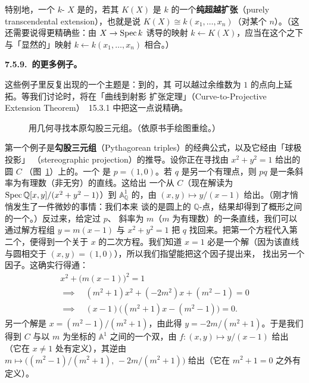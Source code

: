 特别地，一个\trIntegral\trAffine{} $k$-\trVariety{} $X$ 是\trRational{}的，若其\trFunctionField{}%
$K(X)$ 是 $k$ 的一个\textbf{纯超越扩张}（purely transcendental extension），也就是说%
$K(X)\cong k(x_1,\dots,x_n)$（对某个 $n$）。（这还需要说得更精确些：由 $X\to\operatorname{Spec} k$ %
诱导的映射 $k\leftarrow K(X)$，应当在这个\trIsomorphism{}之下与「显然的」映射%
$k\leftarrow k(x_1,\dots,x_n)$ 相合。）

\textbf{7.5.9.\ \trRationalMap{}的更多例子。}

这些例子里反复出现的一个主题是：到\trProjectiveScheme{}的\trRationalMap{}，其\trDomainOfDefinition{}%
可以越过余维数为 $1$ 的\trRegular{}点向上延拓。等我们讨论\trCurve{}时，将在「曲线到射影%
扩张定理」（Curve-to-Projective Extension Theorem）~15.3.1 中把这一点说精确。

\begin{figure}[htbp]
\centering
{}
\caption{用几何寻找本原勾股三元组。（依原书手绘图重绘。）}
\label{fig:pythagorean-stereographic}
\end{figure}

第一个例子是\textbf{勾股三元组}（Pythagorean triples）的经典公式，以及它经由「球极投影」%
（stereographic projection）的推导。设你正在寻找由 $x^2+y^2=1$ 给出的圆 $C$ %
（图~\ref{fig:pythagorean-stereographic}）上的\trRationalPoint。一个\trRationalPoint{}%
是 $p=(1,0)$。若 $q$ 是另一个有理点，则 $pq$ 是一条斜率为有理数（非无穷）的直线。这给出%
一个从\trConic{} $C$（现在解读为 $\operatorname{Spec}\mathbb{Q}[x,y]/(x^2+y^2-1)$）到 $\mathbb{A}^1_{\mathbb{Q}}$ %
的\trRationalMap{}，由 $(x,y)\mapsto y/(x-1)$ 给出。（刚才悄悄发生了一件微妙的事情：我们本来%
谈的是圆上的 $\mathbb{Q}$-点，结果却得到了概形之间的一个\trRationalMap{}。）反过来，给定过 $p$、%
斜率为 $m$（$m$ 为有理数）的一条直线，我们可以通过解方程组 $y=m(x-1)$ 与 $x^2+y^2=1$ %
把 $q$ 找回来。把第一个方程代入第二个，便得到一个关于 $x$ 的二次方程。我们知道 $x=1$ %
必是一个解（因为该直线与圆相交于 $(x,y)=(1,0)$），所以我们指望能把这个因子提出来，%
找出另一个因子。这确实行得通：
\[
\begin{gathered}
x^2+\bigl(m(x-1)\bigr)^2=1\\
\implies\quad (m^2+1)x^2+(-2m^2)x+(m^2-1)=0\\
\implies\quad (x-1)\bigl((m^2+1)x-(m^2-1)\bigr)=0.
\end{gathered}
\]
另一个解是 $x=(m^2-1)/(m^2+1)$，由此得 $y=-2m/(m^2+1)$。于是我们得到\trConic{} $C$ %
与以 $m$ 为坐标的 $\mathbb{A}^1$ 之间的一个双\trRationalMap{}，由 $f\colon(x,y)\mapsto y/(x-1)$ %
给出（它在 $x\neq 1$ 处有定义），其逆\trRationalMap{}由 $m\mapsto\bigl((m^2-1)/(m^2+1),\,-2m/(m^2+1)\bigr)$ %
给出（它在 $m^2+1=0$ 之外有定义）。

